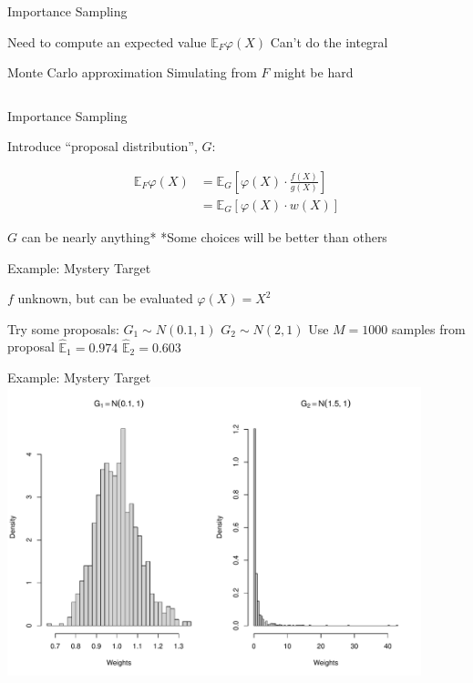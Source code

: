 \documentclass[14pt]{beamer}
\newcommand{\bE}{\mathbb{E}}
\begin{document}
\begin{frame}{Importance Sampling}
    \begin{outline}
        \1 Need to compute an expected value
            \2 $\bE_F \varphi(X)$
        \1 Can't do the integral \newline

        \1 Monte Carlo approximation
            \2 Simulating from $F$ might be hard
    \end{outline}
    \begin{equation*}
    \end{equation*}
\end{frame}

\begin{frame}{Importance Sampling}
    \begin{outline}
        \1 Introduce ``proposal distribution'', $G$:
    \end{outline}
    \begin{align*}
        \bE_F \varphi(X) &=  \bE_G \left[ \varphi(X) \cdot \frac{f(X)}{g(X)} \right] \\
        &=  \bE_G \left[ \varphi(X) \cdot w(X) \right]
    \end{align*}
    \begin{outline}
        \1 $G$ can be nearly anything*
            \2 *Some choices will be better than others
    \end{outline}
\end{frame}

\begin{frame}{Example: Mystery Target}
    \begin{outline}
        \1 $f$ unknown, but can be evaluated 
        \1 $\varphi(X) = X^2$ \newline

        \1 Try some proposals:
            \2 $G_1 \sim N(0.1,1)$
            \2 $G_2 \sim N(2,1)$ \newline
        \1 Use $M=1000$ samples from proposal
            \2 $\hat{\bE}_1 = 0.974$
            \2 $\hat{\bE}_2 = 0.603$
    \end{outline}    
\end{frame}

\begin{frame}{Example: Mystery Target}
    \centering
    \includegraphics[height=0.9\textheight, width=0.9\textwidth, keepaspectratio]{Figures/Wt Hist.pdf}
\end{frame}
\end{document}
